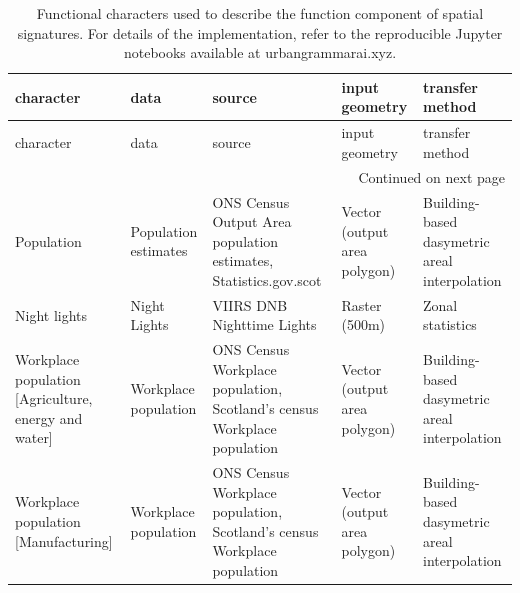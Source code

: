 \documentclass[fleqn,10pt]{wlscirep}
\begin{document}
\begin{longtable}{p{}p{}p{}p{}p{}}
    \caption{\label{tab:function}Functional characters used to
describe the function component of spatial signatures. For details of the implementation,
refer to the reproducible Jupyter notebooks available at urbangrammarai.xyz.}\\
    \toprule
                                                                                                character &                               data  &                                                                     source  &                    input geometry  &                                transfer method  \\
    \midrule
    \endfirsthead
    \toprule
                                                                                                character &                               data  &                                                                     source  &                    input geometry  &                                transfer method  \\
    \midrule
    \endhead
    \midrule
    \multicolumn{5}{r}{{Continued on next page}} \\
    \midrule
    \endfoot
    \bottomrule
    \endlastfoot
                                                                                                Population &               Population estimates  &           ONS Census Output Area population estimates, Statistics.gov.scot  &      Vector (output area polygon)  &  Building-based dasymetric areal interpolation  \\
                                                                                            Night lights &                       Night Lights  &                                                 VIIRS DNB Nighttime Lights  &                     Raster (500m)  &                               Zonal statistics  \\
                                                    Workplace population [Agriculture, energy and water] &               Workplace population  &    ONS Census Workplace population, Scotland's census Workplace population  &      Vector (output area polygon)  &  Building-based dasymetric areal interpolation  \\
                                                                    Workplace population [Manufacturing] &               Workplace population  &    ONS Census Workplace population, Scotland's census Workplace population  &      Vector (output area polygon)  &  Building-based dasymetric areal interpolation  \\

\end{longtable}
\end{document}
